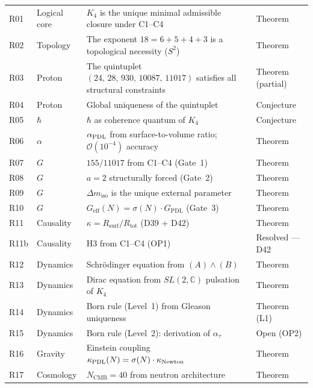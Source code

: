 \documentclass[11pt,a4paper]{article}
\theoremstyle{plain}
\theoremstyle{definition}
\theoremstyle{remark}
\newcommand{\PDL}{\textnormal{PDL}}
\newcommand{\Kfour}{K_4}
\newcommand{\quintuplet}{(24,\,28,\,930,\,10087,\,11017)}
\newcommand{\Geff}{G_{\mathrm{eff}}}
\newcommand{\GPDL}{G_{\mathrm{PDL}}}
\newcommand{\Rsurf}{R_{\mathrm{surf}}}
\newcommand{\Rtot}{R_{\mathrm{tot}}}
\newcommand{\sigmaN}{\sigma(N)}
\begin{document}
\begin{longtable}{@{}L{0.7cm}L{2.5cm}L{6.5cm}L{2.5cm}@{}}
R01 & Logical core & $\Kfour$ is the unique minimal admissible closure under C1--C4 & \textcolor{proofblue}{Theorem} \\[0.3em]
R02 & Topology & The exponent $18=6+5+4+3$ is a topological necessity ($S^2$) & \textcolor{proofblue}{Theorem} \\[0.3em]
R03 & Proton & The quintuplet $\quintuplet$ satisfies all structural constraints & \textcolor{proofblue}{Theorem (partial)} \\[0.3em]
R04 & Proton & Global uniqueness of the quintuplet & \textcolor{conjecturegreen}{Conjecture} \\[0.3em]
R05 & $\hbar$ & $\hbar$ as coherence quantum of $\Kfour$ & \textcolor{conjecturegreen}{Conjecture} \\[0.3em]
R06 & $\alpha$ & $\alpha_{\PDL}$ from surface-to-volume ratio; $\mathcal{O}(10^{-4})$ accuracy & \textcolor{proofblue}{Theorem} \\[0.3em]
R07 & $G$ & $155/11017$ from C1--C4 (Gate~1) & \textcolor{proofblue}{Theorem} \\[0.3em]
R08 & $G$ & $a=2$ structurally forced (Gate~2) & \textcolor{proofblue}{Theorem} \\[0.3em]
R09 & $G$ & $\Delta m_{\mathrm{iso}}$ is the unique external parameter & \textcolor{proofblue}{Theorem} \\[0.3em]
R10 & $G$ & $\Geff(N)=\sigmaN\cdot\GPDL$ (Gate~3) & \textcolor{proofblue}{Theorem} \\[0.3em]
R11 & Causality & $\kappa=\Rsurf/\Rtot$ (D39 + D42) & \textcolor{proofblue}{Theorem} \\[0.3em]
R11b & Causality & H3 from C1--C4 (OP1) & \textcolor{proofblue}{Resolved — D42} \\[0.3em]
R12 & Dynamics & Schr\"odinger equation from $(A)\wedge(B)$ & \textcolor{proofblue}{Theorem} \\[0.3em]
R13 & Dynamics & Dirac equation from $SL(2,\mathbb{C})$ pulsation of $\Kfour$ & \textcolor{proofblue}{Theorem} \\[0.3em]
R14 & Dynamics & Born rule (Level~1) from Gleason uniqueness & \textcolor{proofblue}{Theorem (L1)} \\[0.3em]
R15 & Dynamics & Born rule (Level~2): derivation of $\alpha_\tau$ & \textcolor{openproblemred}{Open (OP2)} \\[0.3em]
R16 & Gravity & Einstein coupling $\kappa_{\PDL}(N)=\sigmaN\cdot\kappa_{\mathrm{Newton}}$ & \textcolor{proofblue}{Theorem} \\[0.3em]
R17 & Cosmology & $N_{\mathrm{CMB}}=40$ from neutron architecture & \textcolor{proofblue}{Theorem} \\[0.3em]

\end{longtable}
\end{document}

